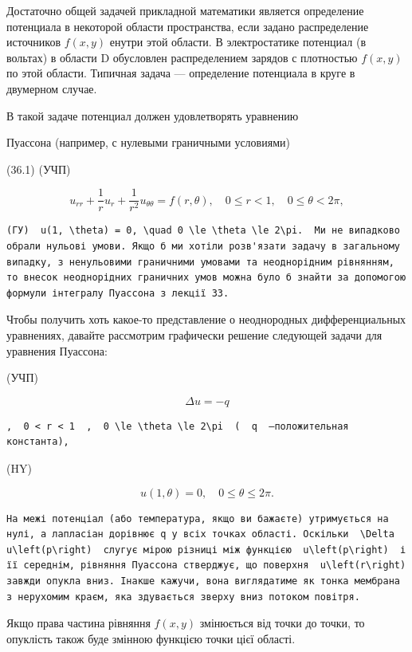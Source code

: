 \documentclass[
  ukrainian,
]{article}
\begin{document}
Достаточно общей задачей прикладной математики является определение
потенциала в некоторой области пространства, если задано распределение
источников \(f(x, y)\) енутри этой области. В электростатике потенциал
(в вольтах) в области D обусловлен распределением зарядов с плотностью
\(f(x, y)\) по этой области. Типичная задача --- определение потенциала
в круге в двумерном случае.

В такой задаче потенциал должен удовлетворять уравнению

Пуассона (например, с нулевыми граничными условиями)

(36.1) (УЧП)

\[
u_{rr} + \frac{1}{r} u_r + \frac{1}{r^2} u_{\theta\theta} = f(r, \theta), \quad 0 \le r < 1, \quad 0 \le \theta < 2\pi,
\]

\begin{verbatim}
(ГУ)  u(1, \theta) = 0, \quad 0 \le \theta \le 2\pi.  Ми не випадково обрали нульові умови. Якщо б ми хотіли розв'язати задачу в загальному випадку, з ненульовими граничними умовами та неоднорідним рівнянням, то внесок неоднорідних граничних умов можна було б знайти за допомогою формули інтегралу Пуассона з лекції 33.
\end{verbatim}

Чтобы получить хоть какое-то представление о неоднородных
дифференциальных уравнениях, давайте рассмотрим графически решение
следующей задачи для уравнения Пуассона:

(УЧП)

\[
\Delta u = -q
\]

\begin{verbatim}
,  0 < r < 1  ,  0 \le \theta \le 2\pi  (  q  —положительная константа),
\end{verbatim}

(HY)

\[
u(1, \theta) = 0, \quad 0 \le \theta \le 2\pi.
\]

\begin{verbatim}
На межі потенціал (або температура, якщо ви бажаєте) утримується на нулі, а лапласіан дорівнює q у всіх точках області. Оскільки  \Delta u\left(p\right)  слугує мірою різниці між функцією  u\left(p\right)  і її середнім, рівняння Пуассона стверджує, що поверхня  u\left(r\right)  завжди опукла вниз. Інакше кажучи, вона виглядатиме як тонка мембрана з нерухомим краєм, яка здувається зверху вниз потоком повітря.
\end{verbatim}

Якщо права частина рівняння \(f(x, y)\) змінюється від точки до точки,
то опуклість також буде змінною функцією точки цієї області.
\end{document}
